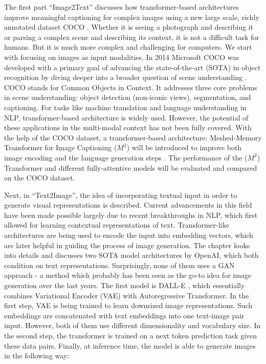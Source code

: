 \documentclass[
]{krantz}
\begin{document}
The first part ``Image2Text'' discusses how transformer-based architectures improve meaningful captioning for complex images using a new large scale, richly annotated dataset COCO \citep{mccoco, cornia2020m2}.
Whether it is seeing a photograph and describing it or parsing a complex scene and describing its context, it is not a difficult task for humans.
But it is much more complex and challenging for computers.
We start with focusing on images as input modalities.
In 2014 Microsoft COCO was developed with a primary goal of advancing the state-of-the-art (SOTA) in object recognition by diving deeper into a broader question of scene understanding \citep{mccoco}.
COCO stands for Common Objects in Context.
It addresses three core problems in scene understanding: object detection (non-iconic views), segmentation, and captioning.
For tasks like machine translation and language understanding in NLP, transformer-based architecture is widely used.
However, the potential of these applications in the multi-modal context has not been fully covered.
With the help of the COCO dataset, a transformer-based architecture: Meshed-Memory Transformer for Image Captioning (\(M^2\)) will be introduced to improve both image encoding and the language generation steps \citep{cornia2020m2}.
The performance of the (\(M^2\)) Transformer and different fully-attentive models will be evaluated and compared on the COCO dataset.

Next, in ``Text2Image'', the idea of incorporating textual input in order to generate visual representations is described.
Current advancements in this field have been made possible largely due to recent breakthroughs in NLP, which first allowed for learning contextual representations of text.
Transformer-like architectures are being used to encode the input into embedding vectors, which are later helpful in guiding the process of image generation.
The chapter looks into details and discusses two SOTA model architectures by OpenAI, which both condition on text representations.
Surprisingly, none of them uses a GAN approach - a method which probably has been seen as the go-to idea for image generation over the last years.
The first model is DALL-E \citep{ramesh2021dalle}, which essentially combines Variational Encoder (VAE) with Autoregressive Transformer.
In the first step, VAE is being trained to learn downsized image representations.
Such embeddings are concatenated with text embeddings into one text-image pair input.
However, both of them use different dimensionality and vocabulary size.
In the second step, the transformer is trained on a next token prediction task given these data pairs.
Finally, at inference time, the model is able to generate images in the following way:
\end{document}
